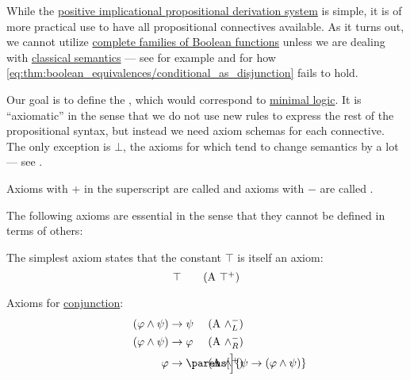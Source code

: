 \begin{definition}\label{def:minimal_propositional_derivation_system}
  While the \hyperref[def:positive_implicational_propositional_derivation_system]{positive implicational propositional derivation system} is simple, it is of more practical use to have all propositional connectives available. As it turns out, we cannot utilize \hyperref[ex:posts_completeness_theorem]{complete families of Boolean functions} unless we are dealing with \hyperref[def:propositional_semantics]{classical semantics} --- see for example  and  for how \cref{eq:thm:boolean_equivalences/conditional_as_disjunction} fails to hold.

  Our goal is to define the , which would correspond to \hyperref[def:minimal_logic]{minimal logic}. It is \enquote{axiomatic} in the sense that we do not use new rules to express the rest of the propositional syntax, but instead we need axiom schemas for each connective. The only exception is \hyperref[def:propositional_language/constants/verum]{\( \bot \)}, the axioms for which tend to change semantics by a lot --- see .

  Axioms with \( + \) in the superscript are called  and axioms with \( - \) are called .

  The following axioms are essential in the sense that they cannot be defined in terms of others:
  \begin{thmenum}[series=def:minimal_propositional_derivation_system]
     The simplest axiom states that the constant \hyperref[def:propositional_language/constants/verum]{\( \top \)} is itself an axiom:
    \begin{equation}\label{eq:def:minimal_propositional_derivation_system/top/intro}
      \top \tag{\textrm{A} \( \top^+ \)}
    \end{equation}

     Axioms for \hyperref[def:propositional_language/connectives/conjunction]{conjunction}:
    \begin{align}
      \mathllap{ (\varphi \wedge \psi) } &\rightarrow \mathrlap{ \psi } \tag{\textrm{A} \( \wedge_L^- \)} \label{eq:def:minimal_propositional_derivation_system/and/elim_left} \\
      \mathllap{ (\varphi \wedge \psi) } &\rightarrow \mathrlap{ \varphi } \tag{\textrm{A} \( \wedge_R^- \)} \label{eq:def:minimal_propositional_derivation_system/and/elim_right} \\
      \mathllap{ \varphi }               &\rightarrow \mathrlap{ \parens[\Big]{ \psi \rightarrow (\varphi \wedge \psi) } } \tag{\textrm{A} \( \wedge^+ \)} \label{eq:def:minimal_propositional_derivation_system/and/intro}
    \end{align}


\end{thmenum}
\end{definition}
